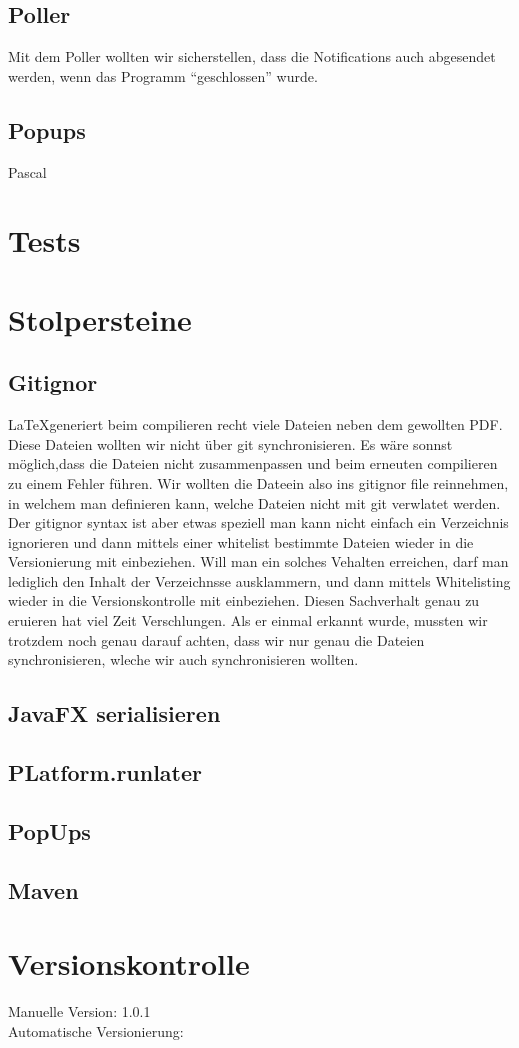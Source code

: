 \documentclass[11pt,titelpage]{scrartcl}
\begin{document}
\subsection{Poller}
Mit dem Poller wollten wir sicherstellen, dass die Notifications auch abgesendet werden, wenn das Programm ``geschlossen'' wurde.
\subsection{Popups}
Pascal
\section{Tests}
\section{Stolpersteine}
\subsection{Gitignor}
\LaTeX generiert beim compilieren recht viele Dateien neben dem gewollten PDF. Diese Dateien wollten wir nicht über git synchronisieren. Es wäre sonnst möglich,dass die Dateien nicht zusammenpassen und beim erneuten compilieren zu einem Fehler führen. Wir wollten die Dateein also ins gitignor file reinnehmen, in welchem man definieren kann, welche Dateien nicht mit git verwlatet werden.
Der gitignor syntax ist aber etwas speziell man kann nicht einfach ein  Verzeichnis ignorieren und dann mittels einer whitelist bestimmte Dateien wieder in die Versionierung mit einbeziehen. Will man ein solches Vehalten erreichen, darf man lediglich den Inhalt der Verzeichnsse ausklammern, und dann mittels Whitelisting wieder in die Versionskontrolle mit einbeziehen. Diesen Sachverhalt genau zu eruieren hat viel Zeit Verschlungen. Als er einmal erkannt wurde, mussten wir trotzdem noch genau darauf achten, dass wir nur genau die Dateien synchronisieren, wleche wir auch synchronisieren wollten.
\subsection{JavaFX serialisieren}
\subsection{PLatform.runlater}
\subsection{PopUps}
\subsection{Maven}






\section{Versionskontrolle}
Manuelle Version: 1.0.1
\\

\noindent
Automatische Versionierung:
\immediate{}

\immediate{}
\end{document}
